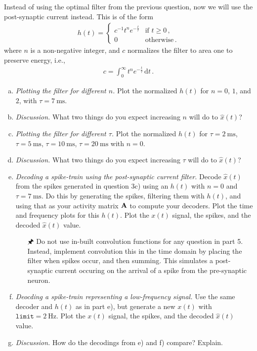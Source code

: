 	Instead of using the optimal filter from the previous question, now we will use the post-synaptic current instead. This is of the form
	\begin{align*}
		h(t)= \begin{cases}
			c^{-1} t^n e^{-\frac{t}\tau} & \text{if } t \geq 0 \,, \\
			0 & \text{otherwise} \,.
		\end{cases}
	\end{align*}
	where $n$ is a non-negative integer, and $c$ normalizes the filter to area one to preserve energy, i.e.,
	\begin{align*}
		c = \int_0^\infty t^n e^{-\frac{t}\tau} \,\mathrm{d}t \,.
	\end{align*}
	\begin{enumerate}[a)]
		\item {} \textit{Plotting the filter for different $n$.} Plot the normalized $h(t)$ for $n=0$, $1$, and $2$, with $\tau=\SI{7}{\milli\second}$.
		\item {} \textit{Discussion.} What two things do you expect increasing $n$ will do to $\hat{x}(t)$?
		\item {} \textit{Plotting the filter for different $\tau$.} Plot the normalized $h(t)$ for $\tau=\SI{2}{\milli\second}$, $\tau=\SI{5}{\milli\second}$, $\tau=\SI{10}{\milli\second}$, $\tau=\SI{20}{\milli\second}$ with $n = 0$.
		\item {} \textit{Discussion.} What two things do you expect increasing $\tau$ will do to $\hat{x}(t)$?
		\item {} \textit{Decoding a spike-train using the post-synaptic current filter.} Decode $\hat{x}(t)$ from the spikes generated in question 3c) using an $h(t)$ with $n=0$ and $\tau=\SI{7}{\milli\second}$. Do this by generating the spikes, filtering them with $h(t)$, and using that as your activity matrix ${\mathbf{A}}$ to compute your decoders. Plot the time and frequency plots for this $h(t)$. Plot the $x(t)$ signal, the spikes, and the decoded $\hat{x}(t)$ value.
		\begin{itemize}
			\item[\symbolfont 🖈] Do not use in-built convolution functions for any question in part 5. Instead, implement convolution this in the time domain by placing the filter when spikes occur, and then summing. This simulates a post-synaptic current occuring on the arrival of a spike from the pre-synaptic neuron.
		\end{itemize}
		\item {} \textit{Deocding a spike-train representing a low-frequency signal.} Use the same decoder and $h(t)$ as in part e), but generate a new $x(t)$ with $\mathtt{limit}=\SI{2}{\hertz}$. Plot the $x(t)$ signal, the spikes, and the decoded $\hat{x}(t)$ value.
		\item {} \textit{Discussion.} How do the decodings from e) and f) compare? Explain.
	\end{enumerate}

